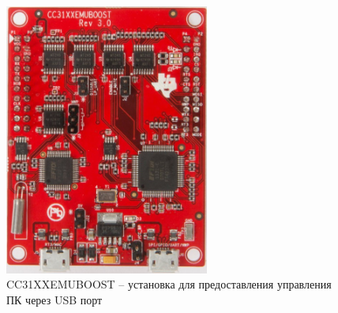 \begin{figure}[!ht]
    \centering
    \includegraphics[width=0.6\textwidth]{figures/CC31XXEMUBOOST}
    \caption{CC31XXEMUBOOST -- установка для предоставления управления
    ПК через USB порт}
    \label{apx:cc31xxemuboost}
\end{figure}

